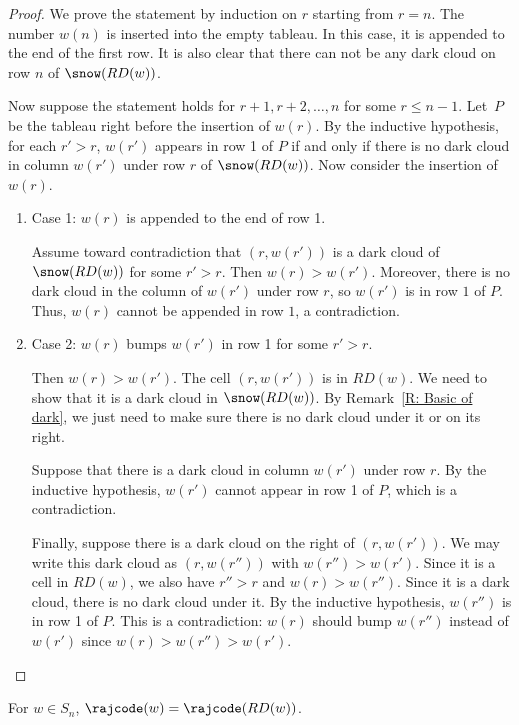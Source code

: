 \begin{proof}
We prove the statement by induction on $r$ starting from $r=n$.
The number $w(n)$ is inserted into the empty tableau. 
In this case, it is appended to the end of the first row. 
It is also clear that there can not be any dark cloud on row $n$ of $\snow(RD(w))$.

Now suppose the statement holds for $r+1,r+2,\dots,n$ for some $r \leqslant n-1$. 
Let~$P$ be the tableau right before the insertion of $w(r)$.
By the inductive hypothesis, for each $r' > r$, $w(r')$ appears in row 1 of $P$
if and only if there is no dark cloud in column $w(r')$ under row $r$ of $\snow(RD(w))$.
Now consider the insertion of $w(r)$.
\begin{enumerate}
\item Case 1: $w(r)$ is appended to the end of row 1. 

Assume toward contradiction that $(r, w(r'))$ is a dark cloud of $\snow(RD(w))$ for some $r' > r$. 
Then $w(r) > w(r')$. 
Moreover, there is no dark cloud in the column of $w(r')$ under row $r$,
so $w(r')$ is in row $1$ of $P$. 
Thus, $w(r)$ cannot be appended in row $1$, a contradiction.
\item Case 2: $w(r)$ bumps $w(r')$ in row 1 for some $r' > r$.

Then $w(r) > w(r')$.
The cell $(r, w(r'))$ is in $RD(w)$. We need to show that it is a dark cloud in $\snow(RD(w))$.
By Remark~\ref{R: Basic of dark}, we just need to make sure
there is no dark cloud under it or on its right.

Suppose that there is a dark cloud in column $w(r')$ under row $r$. By the inductive hypothesis, $w(r')$ cannot appear in row 1 of $P$, which is a contradiction.

Finally, suppose there is a dark cloud on the right of $(r, w(r'))$.
We may write this dark cloud as $(r, w(r''))$ with $w(r'') > w(r')$.
Since it is a cell in $RD(w)$,
we also have $r'' > r$ and $w(r) > w(r'')$.
Since it is a dark cloud, there is no dark cloud under it.
By the inductive hypothesis, $w(r'')$ is in row 1 of $P$.
This is a contradiction: $w(r)$ should bump $w(r'')$ instead of $w(r')$ 
since $w(r) > w(r'') > w(r')$. \qedhere
\end{enumerate}
\end{proof}


\begin{ourthm}
\label{T: equivalence of rajcode on perm}
For $w \in S_n$, 
$\rajcode(w) = \rajcode(RD(w))$.
\end{ourthm}

